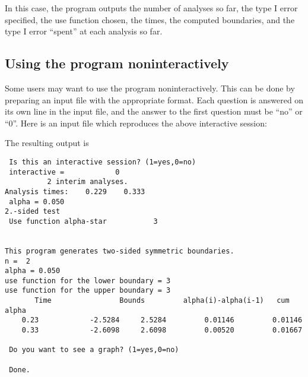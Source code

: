 In this case, the program outputs the number of analyses so far, the type I
error specified, the use function chosen, the times, the computed
boundaries, and the type I error ``spent'' at each analysis so far.


\subsection{Using the program noninteractively}

Some users may want to use the program noninteractively.  This can be done
by preparing an input file with the appropriate format.  Each question is
answered on its own line in the input file, and the answer to the first
question must be ``no'' or ``0''.  Here is an input file which reproduces
the above interactive session: {
The resulting output is {\scriptsize \singlespace
\begin{verbatim}
 Is this an interactive session? (1=yes,0=no)
 interactive =            0
          2 interim analyses.
Analysis times:    0.229    0.333
 alpha = 0.050
2.-sided test
 Use function alpha-star           3


This program generates two-sided symmetric boundaries.
n =  2
alpha = 0.050
use function for the lower boundary = 3
use function for the upper boundary = 3
       Time                Bounds         alpha(i)-alpha(i-1)   cum alpha
    0.23            -2.5284     2.5284         0.01146         0.01146
    0.33            -2.6098     2.6098         0.00520         0.01667

 Do you want to see a graph? (1=yes,0=no)

 Done.
\end{verbatim}}}


